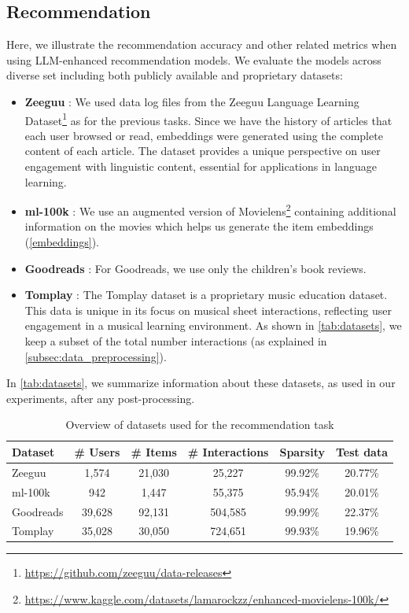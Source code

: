 \subsection{Recommendation}\label{sec:recommendation_results}

Here, we illustrate the recommendation accuracy and other related metrics when using LLM-enhanced recommendation models. We evaluate the models across diverse set including both publicly available and proprietary datasets:

\begin{itemize}
    \item \textbf{Zeeguu} \cite{Lungu18}:  We used data log files from the Zeeguu Language Learning Dataset\footnote{\url{https://github.com/zeeguu/data-releases}} as for the previous tasks. Since we have the history of articles that each user browsed or read, embeddings were generated using the complete content of each article. The dataset provides a unique perspective on user engagement with linguistic content, essential for applications in language learning.
    
    \item \textbf{ml-100k} \cite{movielens}:  We use an augmented version of Movielens\footnote{\url{https://www.kaggle.com/datasets/lamarockzz/enhanced-movielens-100k/}} containing additional information on the movies which helps us generate the item embeddings  (\autoref{embeddings}).
    \item \textbf{Goodreads} \cite{goodreads1,goodreads2}: For Goodreads, we use only the children's book reviews. 
    \item \textbf{Tomplay} \cite{tomplay}: The Tomplay dataset is a proprietary music education dataset. This data is unique in its focus on musical sheet interactions, reflecting user engagement in a musical learning environment. As shown in \autoref{tab:datasets}, we keep a subset of the total number interactions (as explained in \autoref{subsec:data_preprocessing}). 
    
\end{itemize}

In \autoref{tab:datasets}, we summarize information about these datasets, as used in our experiments, after any post-processing.


\begin{table}[ht]
\centering
\caption{Overview of datasets used for the recommendation task}
\label{tab:datasets}
\begin{tabular}{lccccc}
\toprule
\textbf{Dataset} & \textbf{\# Users} & \textbf{\# Items} & \textbf{\# Interactions} & \textbf{Sparsity} & \textbf{Test data}  \\
\midrule
Zeeguu        & 1,574 & 21,030 & 25,227 & 99.92\% & 20.77\%\\
ml-100k          & 942 & 1,447 & 55,375 & 95.94\% & 20.01\%\\ %
Goodreads        & 39,628 & 92,131 & 504,585 & 99.99\% & 22.37\%\\ %
Tomplay          & 35,028 & 30,050 & 724,651 & 99.93\% & 19.96\%\\
\bottomrule
\end{tabular}
\end{table}

